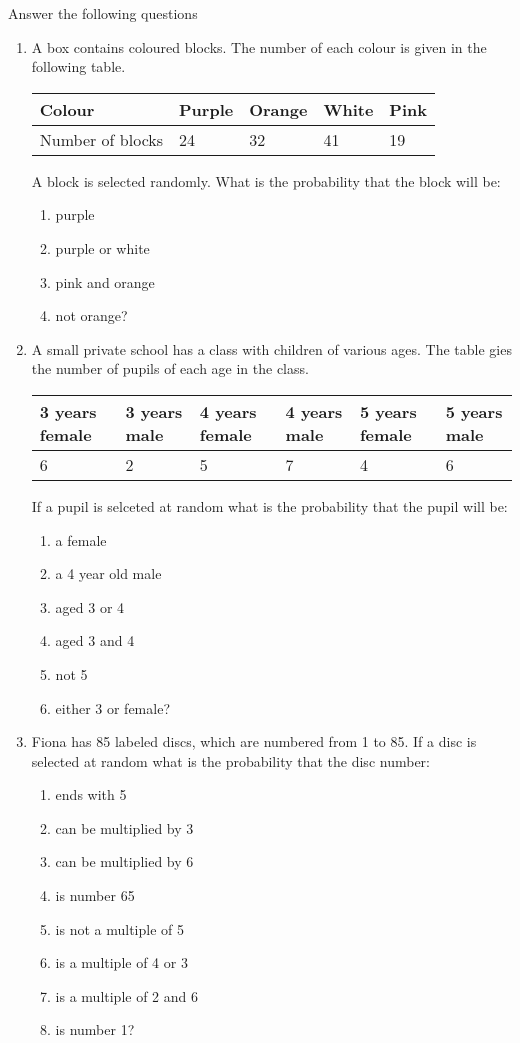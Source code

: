 \documentclass[10pt,a4paper,titlepage,twoside,openright]{report}
\begin{document}
{Answer the following questions}
{
\begin{enumerate}
\item A box contains coloured blocks. The number of each colour is given in the following table.
\begin{center}
\begin{tabular}{|l|l|l|l|l|}
\hline
Colour & Purple & Orange & White & Pink \\ 
\hline
Number of blocks & 24 & 32 & 41 & 19 \\ 
\hline
\end{tabular}
\end{center}
A block is selected randomly. What is the probability that the block will be: 
	\begin{enumerate}
	\item purple  
	\item purple or white 
	\item pink and orange 
	\item not orange? 
	\end{enumerate}
\item A small private school has a class with children of various ages. The table gies the number of pupils of each age in the class.
\begin{center}
\begin{tabular}{|l|l|l|l|l|l|}
\hline
3 years female & 3 years male & 4 years female & 4 years male & 5 years female & 5 years male \\ 
\hline
6 & 2 & 5 & 7 & 4 & 6 \\
\hline
\end{tabular}
\end{center}
If a pupil is selceted at random what is the probability that the pupil will be: 
	\begin{enumerate}
	\item a female 
	\item a 4 year old male 
	\item aged 3 or 4 
	\item aged 3 and 4 
	\item not 5 
	\item either 3 or female? 
	\end{enumerate}
\item Fiona has 85 labeled discs, which are numbered from 1 to 85. If a disc is selected at random what is the probability that the disc number:	
	\begin{enumerate} 
	\item ends with 5 
	\item can be multiplied by 3 
	\item can be multiplied by 6
	\item is number 65 
	\item is not a multiple of 5
	\item is a multiple of 4 or 3 
	\item is a multiple of 2 and 6
	\item is number 1? 
	\end{enumerate}
\end{enumerate}
}
\end{document}
